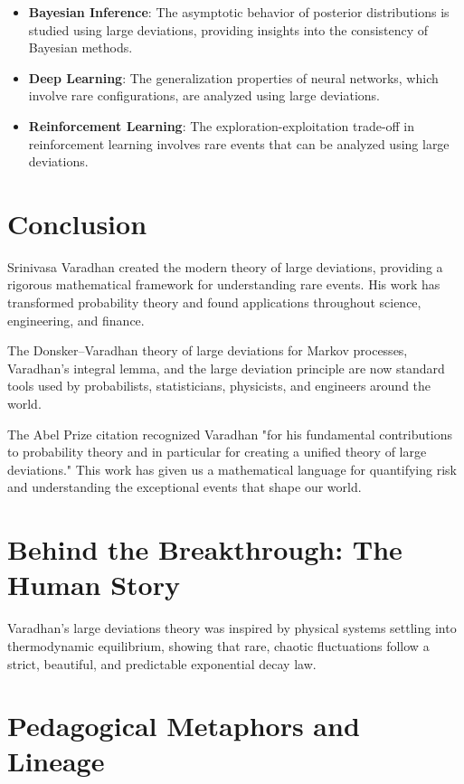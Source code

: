 \begin{itemize}
\item \textbf{Bayesian Inference}: The asymptotic behavior of posterior distributions is studied using large deviations, providing insights into the consistency of Bayesian methods.

\item \textbf{Deep Learning}: The generalization properties of neural networks, which involve rare configurations, are analyzed using large deviations.

\item \textbf{Reinforcement Learning}: The exploration-exploitation trade-off in reinforcement learning involves rare events that can be analyzed using large deviations.
\end{itemize}

\section{Conclusion}

Srinivasa Varadhan created the modern theory of large deviations, providing a rigorous mathematical framework for understanding rare events. His work has transformed probability theory and found applications throughout science, engineering, and finance.

The Donsker--Varadhan theory of large deviations for Markov processes, Varadhan's integral lemma, and the large deviation principle are now standard tools used by probabilists, statisticians, physicists, and engineers around the world.

The Abel Prize citation recognized Varadhan "for his fundamental contributions to probability theory and in particular for creating a unified theory of large deviations." This work has given us a mathematical language for quantifying risk and understanding the exceptional events that shape our world.


\section{Behind the Breakthrough: The Human Story}
Varadhan's large deviations theory was inspired by physical systems settling into thermodynamic equilibrium, showing that rare, chaotic fluctuations follow a strict, beautiful, and predictable exponential decay law.

\section{Pedagogical Metaphors and Lineage}
